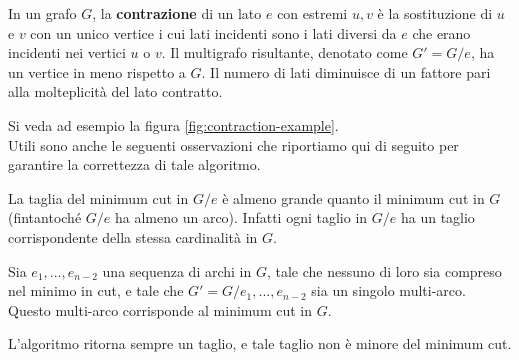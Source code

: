 \begin{defn}
In un grafo $ G $, la \textbf{contrazione} di un lato $e$ con estremi $u, v$ è la sostituzione di $ u $ e $ v $ con un unico vertice i cui lati incidenti sono i lati diversi da $ e $ che erano incidenti nei vertici $ u $ o $ v $.
Il multigrafo risultante, denotato come $G' = G/e$, ha un vertice in meno rispetto a $G$. Il numero di lati diminuisce di un fattore pari alla molteplicità del lato contratto.
\end{defn}

\noindent Si veda ad esempio la figura \ref{fig:contraction-example}.\\

\noindent Utili sono anche le seguenti osservazioni che riportiamo qui di seguito per garantire la correttezza di tale algoritmo.

\begin{obser}
La taglia del minimum cut in $ G/e $ è almeno grande quanto il minimum cut in $ G $  (fintantoché $ G/e $ ha almeno un arco). Infatti ogni taglio in $ G/e $ ha un taglio corrispondente della stessa cardinalità in $ G $.
\end{obser}

\begin{obser}
Sia $ e_1,...,e_{n-2} $ una sequenza di archi in $ G $, tale che nessuno di loro sia compreso nel minimo in cut, e tale che $ G'=G/{ e_1,...,e_{n-2}} $ sia un singolo multi-arco. Questo multi-arco corrisponde al minimum cut in $ G $.
\end{obser}

\begin{obser}
L'algoritmo ritorna sempre un taglio, e tale taglio non è minore del minimum cut.
\end{obser}




